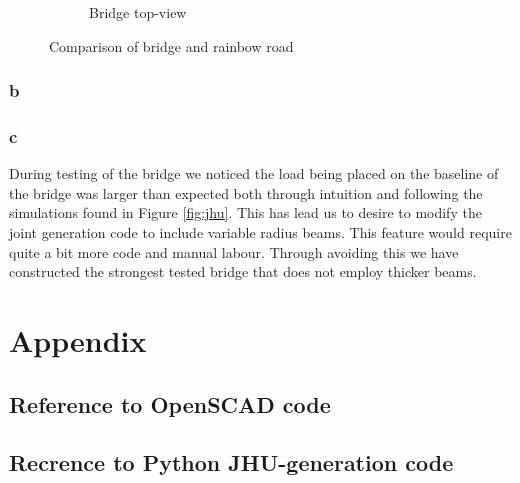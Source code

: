 \documentclass{report}
\begin{document}
\begin{figure}[H]
\begin{subfigure}{.5\textwidth}
		\caption{Bridge top-view}
	\end{subfigure}

	\caption{Comparison of bridge and rainbow road}
	\label{fig:gey}
\end{figure}

\subsection{b}

\subsection{c}

During testing of the bridge we noticed the load being placed on the baseline of the bridge was larger than expected both through intuition and following the simulations found in Figure \ref{fig:jhu}. This has lead us to desire to modify the joint generation code to include variable radius beams. This feature would require quite a bit more code and manual labour. Through avoiding this we have constructed the strongest tested bridge that does not employ thicker beams.

\chapter{Appendix}

\section{Reference to OpenSCAD code}
\label{sec:openscad}



\section{Recrence to Python JHU-generation code}
\label{sec:jhu-gen}



\listoffigures


\end{document}
